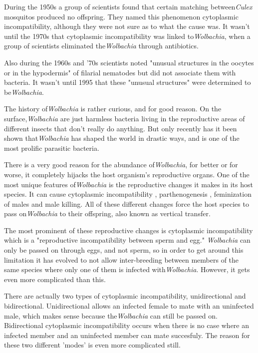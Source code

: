 \documentclass[twocolumn]{article}
\begin{document}
During the 1950s a group of scientists found that certain matching between\textit{Culex} mosquitos produced no offspring. They named this phenomenon cytoplasmic incompatibility, although they were not sure as to what the cause was.\cite{Wcyto_iso} It wasn't until the 1970s that cytoplasmic incompatibility was linked to\textit{Wolbachia}, when a group of scientists eliminated the\textit{Wolbachia} through antibiotics.\cite{Wcyto_cause}

Also during the 1960s and '70s scientists noted "unusual structures in the oocytes or in the hypodermis" of filarial nematodes but did not associate them with bacteria.\cite{wolbachia} It wasn't until 1995 that these "unusual structures" were determined to be\textit{Wolbachia}.\cite{Wstruct} 

The history of\textit{Wolbachia} is rather curious, and for good reason. On the surface,\textit{Wolbachia} are just harmless bacteria living in the reproductive areas of different insects that don't really do anything. But only recently has it been shown that\textit{Wolbachia} has shaped the world in drastic ways, and is one of the most prolific parasitic bacteria.\cite{Wdistr}

There is a very good reason for the abundance of\textit{Wolbachia}, for better or for worse, it completely hijacks the host organism's reproductive organs. One of the most unique features of\textit{Wolbachia} is the reproductive changes it makes in its host species. It can cause cytoplasmic incompatibility \cite{Wci0}\cite{Wci1}\cite{Wci2}\cite{Wci3}, parthenogenesis \cite{Wparth}, feminization of males \cite{Wfem} and male killing.\cite{Wmale_killing} All of these different changes force the host species to pass on\textit{Wolbachia} to their offspring, also known as vertical transfer.

The most prominent of these reproductive changes is cytoplasmic incompatibility which is a "reproductive incompatibility between sperm and egg."\cite{Wbio} \textit{Wolbachia} can only be passed on through eggs, and not sperm, so in order to get around this limitation it has evolved to not allow inter-breeding between members of the same species where only one of them is infected with\textit{Wolbachia}. However, it gets even more complicated than this.

There are actually two types of cytoplasmic incompatibility, unidirectional and bidirectional. Unidirectional allows an infected female to mate with an uninfected male, which makes sense because the\textit{Wolbachia} can still be passed on. Bidirectional cytoplasmic incompatibility occurs when there is no case where an infected member and an uninfected member can mate succesfuly. The reason for these two different 'modes' is even more complicated still.
\end{document}
